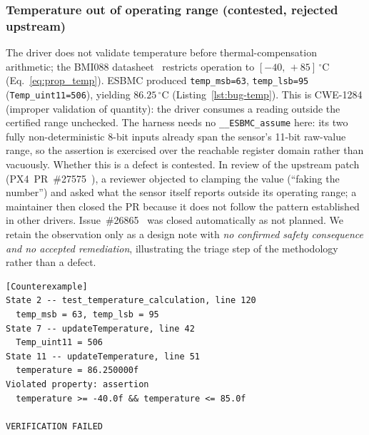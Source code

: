 \documentclass[conference]{IEEEtran}
\newcommand{\entra}[1]{#1}
\newcommand{\corr}[1]{#1}
\begin{document}
\subsubsection{Temperature out of operating range (contested, rejected upstream)}
The driver does not validate temperature before thermal-compensation
arithmetic; the BMI088 datasheet~\cite{Bosch2022} restricts operation
to $[-40,\,+85]\,^\circ$C (Eq.~\eqref{eq:prop_temp}).
ESBMC produced \texttt{temp\_msb=63}, \texttt{temp\_lsb=95}
(\texttt{Temp\_uint11=506}), yielding $86.25\,^\circ$C
(Listing~\ref{lst:bug-temp}).
This is CWE-1284 (improper validation of quantity): the driver consumes a
reading outside the certified range unchecked.
\entra{The harness needs no \texttt{\_\_ESBMC\_assume} here: its two fully
non-deterministic 8-bit inputs already span the sensor's 11-bit raw-value
range, so the assertion is exercised over the reachable register domain
rather than vacuously.}
Whether this is a defect is contested. \corr{In review of the upstream patch (PX4~PR~\#27575~\cite{PX4_PR27575}), a reviewer objected to clamping the value (``faking the number'') and asked what the sensor itself reports outside its operating range; a maintainer then closed the PR because it does not follow the pattern established in other drivers. Issue~\#26865~\cite{PX4_Issue26865} was closed automatically as not planned.}
We
retain the observation only as a design note with \emph{no confirmed
safety consequence and no accepted remediation}, illustrating the
triage step of the methodology rather than a defect.

\begin{lstlisting}[float=t,basicstyle=\ttfamily\scriptsize,
numbers=none,language={},captionpos=b,
caption={ESBMC counterexample: BMI088 temperature $86.25\,^\circ$C
$>$ $85\,^\circ$C. Missing input-range validation (CWE-1284).},
label=lst:bug-temp]
[Counterexample]
State 2 -- test_temperature_calculation, line 120
  temp_msb = 63, temp_lsb = 95
State 7 -- updateTemperature, line 42
  Temp_uint11 = 506
State 11 -- updateTemperature, line 51
  temperature = 86.250000f
Violated property: assertion
  temperature >= -40.0f && temperature <= 85.0f

VERIFICATION FAILED
\end{lstlisting}
\end{document}
